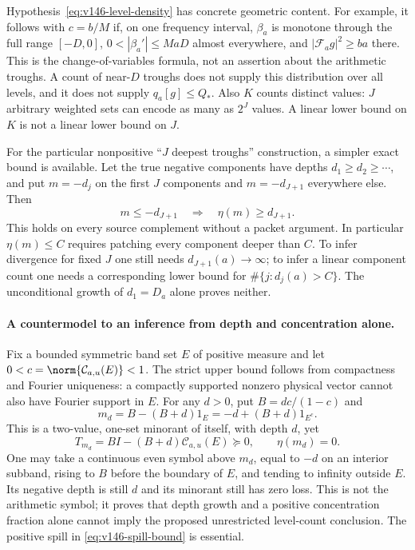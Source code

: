 Hypothesis~\eqref{eq:v146-level-density} has concrete geometric
content. For example, it follows with $c=b/M$ if, on one frequency
interval, $\beta_a$ is monotone through the full range $[-D,0]$,
$0<|\beta_a'|\le MaD$ almost everywhere, and
$|\mathcal F_ag|^2\ge ba$ there. This is the change-of-variables
formula, not an assertion about the arithmetic troughs. A count of
near-$D$ troughs does not supply this distribution over all levels,
and it does not supply $q_a[g]\le Q_*$. Also $K$ counts distinct values:
$J$ arbitrary weighted sets can encode as many as $2^J$ values. A
linear lower bound on $K$ is not a linear lower bound on $J$.

For the particular nonpositive ``$J$ deepest troughs'' construction,
a simpler exact bound is available. Let the true negative components
have depths $d_1\ge d_2\ge\cdots$, and put $m=-d_j$ on the first
$J$ components and $m=-d_{J+1}$ everywhere else. Then
\begin{equation}\label{eq:v146-lobe-floor}
 m\le-d_{J+1}\quad\Longrightarrow\quad\eta(m)\ge d_{J+1}.
\end{equation}
This holds on every source complement without a packet argument.
In particular $\eta(m)\le C$ requires patching every component deeper
than $C$. To infer divergence for fixed $J$ one still needs
$d_{J+1}(a)\to\infty$; to infer a linear component count one needs a
corresponding lower bound for $\#\{j:d_j(a)>C\}$. The unconditional
growth of $d_1=D_a$ alone proves neither.

\paragraph{A countermodel to an inference from depth and concentration alone.}
Fix a bounded symmetric band set $E$ of positive measure and let
$0<c=\norm{\mathcal C_{a,u}(E)}<1$. The strict upper bound follows
from compactness and Fourier uniqueness: a compactly supported
nonzero physical vector cannot also have Fourier support in $E$.
For any $d>0$, put $B=dc/(1-c)$ and
\[
 m_d=B-(B+d)1_E=-d+(B+d)1_{E^c}.
\]
This is a two-value, one-set minorant of itself, with depth $d$, yet
\[
 T_{m_d}=B I-(B+d)\mathcal C_{a,u}(E)\succeq0,
 \qquad \eta(m_d)=0.
\]
One may take a continuous even symbol above $m_d$, equal to $-d$ on
an interior subband, rising to $B$ before the boundary of $E$, and
tending to infinity outside $E$. Its negative depth is still $d$ and
its minorant still has zero loss. This is not the arithmetic symbol;
it proves that depth growth and a positive concentration fraction
alone cannot imply the proposed unrestricted level-count conclusion.
The positive spill in \eqref{eq:v146-spill-bound} is essential.

